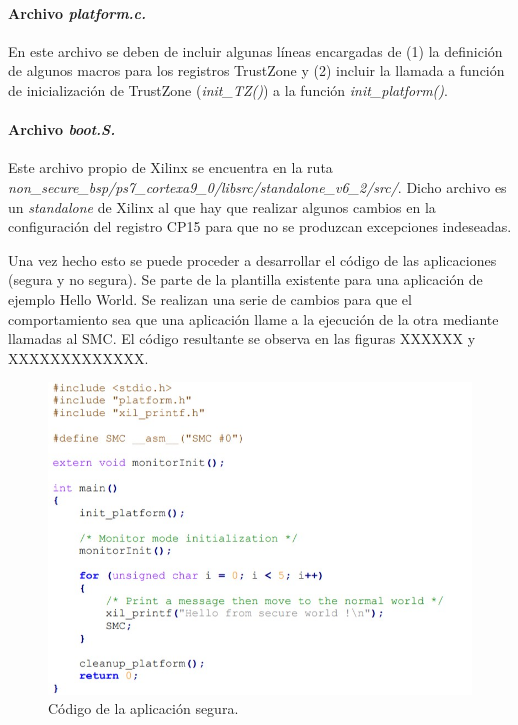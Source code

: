 \paragraph{Archivo \textit{platform.c.}} En este archivo se deben de incluir algunas líneas encargadas de (1) la definición de algunos macros para los registros TrustZone y (2) incluir la llamada a función de inicialización de TrustZone (\textit{init\_TZ()}) a la función \textit{init\_platform()}.

\paragraph{Archivo \textit{boot.S.}} Este archivo propio de Xilinx se encuentra en la ruta \textit{non\_secure\_bsp/ps7\_cortexa9\_0/libsrc/standalone\_v6\_2/src/}. Dicho archivo es un \textit{standalone} de Xilinx al que hay que realizar algunos cambios en la configuración del registro CP15 para que no se produzcan excepciones indeseadas.\newline

Una vez hecho esto se puede proceder a desarrollar el código de las aplicaciones (segura y no segura). Se parte de la plantilla existente para una aplicación de ejemplo Hello World. Se realizan una serie de cambios para que el comportamiento sea que una aplicación llame a la ejecución de la otra mediante llamadas al SMC. El código resultante se observa en las figuras XXXXXX y XXXXXXXXXXXXX.

\begin{figure}
	\centering
	\includegraphics[width=1\textwidth]{imagenes/secureapp.jpg}
	\caption{\label{fig1}Código de la aplicación segura.}
\end{figure}

